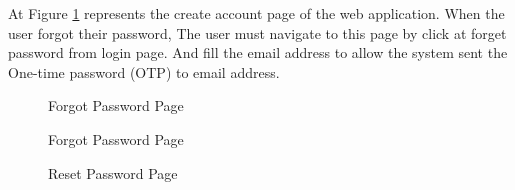 \documentclass[12pt,oneside,openright,a4paper]{cpe-english-project}
\begin{document}
At Figure \ref{fig:Forgot-Password} represents the create account page of the web application. When the user forgot their password, The user must navigate to this page by click at forget password from login page. And fill the email address to allow the system sent the One-time password (OTP) to email address. 


\begin{figure}[!h]
\centering
{}
\caption{Forgot Password Page}\label{fig:Forgot-Password}
\end{figure}



\begin{figure}[!h]
\centering
{}
\caption{Forgot Password Page}\label{fig:Forgot-Password-code}
\end{figure}

\begin{figure}[!h]
\centering
{}
\caption{Reset Password Page}\label{fig:Reset Password}
\end{figure}
\end{document}
